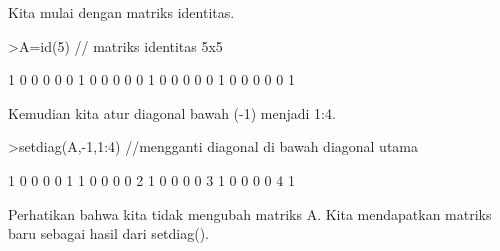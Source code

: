 \documentclass[a4paper,10pt]{article}
\begin{document}
\begin{eulernotebook}
\begin{eulercomment}
\begin{eulercomment}
\begin{eulercomment}
\begin{eulercomment}
\begin{eulercomment}
\begin{eulercomment}
\begin{eulercomment}
Kita mulai dengan matriks identitas.
\end{eulercomment}
\begin{eulerprompt}
>A=id(5) // matriks identitas 5x5
\end{eulerprompt}
\begin{euleroutput}
              1             0             0             0             0 
              0             1             0             0             0 
              0             0             1             0             0 
              0             0             0             1             0 
              0             0             0             0             1 
\end{euleroutput}
\begin{eulercomment}
Kemudian kita atur diagonal bawah (-1) menjadi 1:4.
\end{eulercomment}
\begin{eulerprompt}
>setdiag(A,-1,1:4) //mengganti diagonal di bawah diagonal utama
\end{eulerprompt}
\begin{euleroutput}
              1             0             0             0             0 
              1             1             0             0             0 
              0             2             1             0             0 
              0             0             3             1             0 
              0             0             0             4             1 
\end{euleroutput}
\begin{eulercomment}
Perhatikan bahwa kita tidak mengubah matriks A. Kita mendapatkan
matriks baru sebagai hasil dari setdiag().


\end{eulercomment}
\end{eulercomment}
\end{eulercomment}
\end{eulercomment}
\end{eulercomment}
\end{eulercomment}
\end{eulercomment}
\end{eulernotebook}
\end{document}
